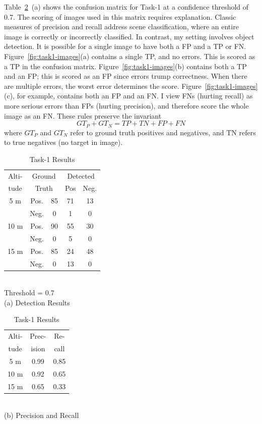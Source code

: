Table~\ref{tab:task1-results}~(a) shows the confusion matrix for
Task-1 at a confidence threshold of 0.7.  The scoring of images used
in this matrix requires explanation. Classic measures of precision and
recall address scene classification, where an entire image is
correctly or incorrectly classified.  In contrast, my setting
involves object detection.  It is possible for a single image to have
both a FP and a TP or FN.  Figure~\ref{fig:task1-images}(a) contains
a single TP, and no errors.  This is scored as a TP in the confusion
matrix.  Figure~\ref{fig:task1-images}(b) contains both a TP and an
FP; this is scored as an FP since errors trump correctness.  When
there are multiple errors, the worst error determines the score.
Figure~\ref{fig:task1-images}(c), for example, contains both an FP and
an FN.  I view FNs (hurting recall) as more serious errors than FPs
(hurting precision), and therefore score the whole image as an FN.
These rules preserve the invariant
$$GT_P + GT_N = TP + TN + FP + FN$$
where $GT_P$ and $GT_N$ refer to ground truth positives and negatives,
and TN refers to true negatives (no target in image).

\begin{table}
\centering\small
\begin{minipage}[b]{2.4in}
\centering\small
\begin{tabular}{|c|c|c|c|c|}
\hline
Alti-&\multicolumn{2}{c|}{Ground}&\multicolumn{2}{c|}{Detected}\\
\cline{4-5}
tude&\multicolumn{2}{c|}{Truth}& Pos& Neg.\\
\hline
5 m & Pos. & 85 & 71 & 13\\
    & Neg. &  0 & 1  & 0\\
\hline
10 m & Pos. & 90 & 55 & 30\\
     & Neg. &  0 & 5  & 0 \\
\hline
15 m & Pos. & 85 & 24 & 48 \\
     & Neg. &  0 & 13 & 0\\
\hline
\end{tabular}\\[0.05in]
{\footnotesize Threshold = 0.7}\\
(a) Detection Results\\
\end{minipage}
\begin{minipage}[b]{1.4in}
\centering
\begin{tabular}{|c|c|c|}
\hline
Alti-& Prec- & Re-\\
tude & ision & call\\
\hline
5 m & 0.99 & 0.85 \\
10 m &0.92 & 0.65\\
15 m & 0.65 & 0.33 \\
\hline
\end{tabular}\\[0.05in]
(b) Precision and Recall
\end{minipage}

\caption{Task-1 Results}
\label{tab:task1-results}
\vspace{-0.2in}
\end{table}


